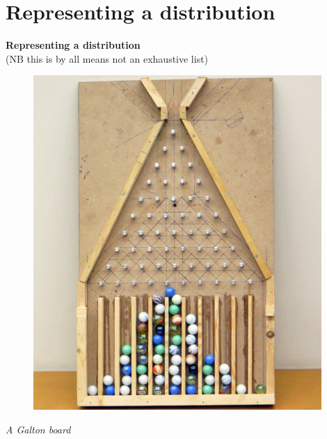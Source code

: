 \documentclass[compress]{beamer}
\begin{document}
\section{Representing a distribution}
\begin{frame}[plain]
    \centering \Large
    \textbf{Representing a distribution} \\
	(NB this is by all means not an exhaustive list) \\
	\vspace{0.2cm}
	\begin{figure}
		\centering
		\includegraphics[scale=0.8]{Picture/Galton_Board_5.jpeg}
	\end{figure}
	\textit{A Galton board}
\end{frame}
\end{document}
